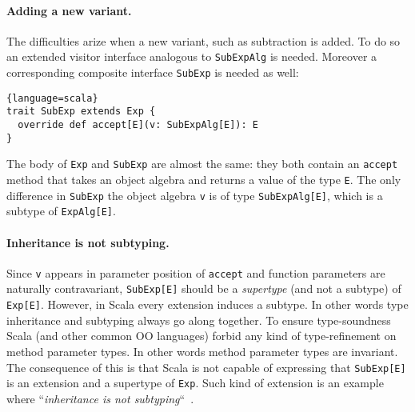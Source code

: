 \begin{comment}
The actual shape of the expressions
(i.e., variants) is determined by the type of the visitor, which we define in
another trait:
\begin{lstlisting}{language=scala}
trait ExpVisitor[E] {
  def lit(x: Int): E
  def add(e1: E, e2: E): E
}
\end{lstlisting}
\end{comment}

\paragraph{Adding a new variant.}
The difficulties arize when a new variant, such as subtraction is
added. To do so an extended visitor interface analogous to
\lstinline$SubExpAlg$ is needed. Moreover a corresponding composite 
interface \lstinline$SubExp$ is needed as well:
\begin{lstlisting}{language=scala}
trait SubExp extends Exp {
  override def accept[E](v: SubExpAlg[E]): E
}
\end{lstlisting}
The body of \lstinline{Exp} and \lstinline{SubExp} are almost the same: they
both contain an \lstinline{accept} method that takes an object algebra 
and returns a value of the type \lstinline{E}. The only difference in
\lstinline{SubExp} the object algebra
\lstinline{v} is of type \lstinline{SubExpAlg[E]}, which is a subtype of
\lstinline{ExpAlg[E]}. 

\paragraph{Inheritance is not subtyping.}
Since \lstinline{v} appears in parameter position of
\lstinline{accept} and function parameters are naturally contravariant,
\lstinline{SubExp[E]} should be a \emph{supertype} (and not a subtype)
of \lstinline{Exp[E]}.  However, in Scala every extension induces a
subtype. In other words type inheritance and subtyping always go along
together.  To ensure type-soundness Scala (and other common OO
languages) forbid any kind of type-refinement on method parameter
types.  In other words method parameter types are invariant.
The consequence of this is that Scala is not capable of expressing
that \lstinline{SubExp[E]} is an extension and a supertype of
\lstinline{Exp}. Such kind of extension is an example where
``\emph{inheritance is not subtyping}``~\cite{cook1989inheritance}.

